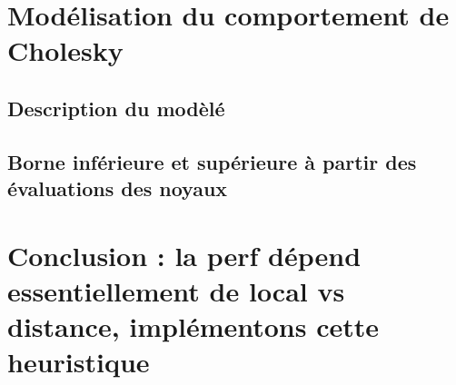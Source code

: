 \section{Modélisation du comportement de Cholesky}
\subsection{Description du modèlé}
\subsection{Borne inférieure et supérieure à partir des évaluations des noyaux}

\section{Conclusion : la perf dépend essentiellement de local vs distance, implémentons cette heuristique}
